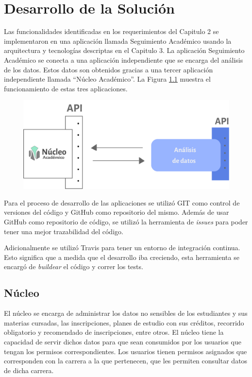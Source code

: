 \chapter{Desarrollo de la Solución}
\label{sec:desarrollo}

Las funcionalidades identificadas en los requerimientos del Capitulo 2 se implementaron en una aplicación llamada Seguimiento Académico usando la arquitectura y tecnologías descriptas en el Capitulo 3.
La aplicación Seguimiento Académico se conecta a una aplicación independiente que se encarga del análisis de los datos. Estos datos son obtenidos gracias a una tercer aplicación independiente llamada “Núcleo Académico”.
La Figura \ref{fig:analisis-nucleo} muestra el funcionamiento de estas tres aplicaciones.

\begin{figure}[h!]
  \centering
    \includegraphics[scale=0.8]{images/analisis-datos/analisis-datos.png}
  \label{fig:analisis-nucleo}
\end{figure}

Para el proceso de desarrollo de las aplicaciones se utilizó GIT como control de versiones del código y GitHub como repositorio del mismo. Además de usar GitHub como repositorio de código, se utilizó la herramienta de \textit{issues} para poder tener una mejor trazabilidad del código.

Adicionalmente se utilizó Travis para tener un entorno de integración continua. Esto significa que a medida que el desarrollo iba creciendo, esta herramienta se encargó de \textit{buildear} el código y correr los tests.  

\section[Núcleo]{Núcleo}

El núcleo se encarga de administrar los datos no sensibles de los estudiantes y sus materias cursadas, las inscripciones, planes de estudio con sus créditos, recorrido obligatorio y recomendado de inscripciones, entre otros.
El núcleo tiene la capacidad de servir dichos datos para que sean consumidos por los usuarios que tengan los permisos correspondientes.
Los usuarios tienen permisos asignados que corresponden con la carrera a la que pertenecen, que les permiten consultar datos de dicha carrera. 


